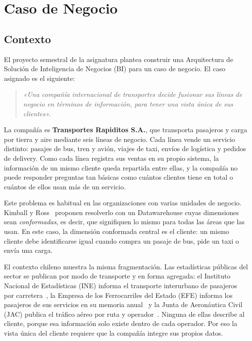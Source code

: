 \section{Caso de Negocio}
\label{sec:caso}

\subsection{Contexto}

El proyecto semestral de la asignatura plantea construir una Arquitectura de
Solución de Inteligencia de Negocios (BI) para un caso de negocio. El caso
asignado es el siguiente:

\begin{quote}
  \itshape
  «Una compañía internacional de transportes decide fusionar sus líneas de
  negocio en términos de información, para tener una vista única de sus
  clientes».
\end{quote}

La compañía es \textbf{Transportes Rapiditos S.A.}, que transporta pasajeros y
carga por tierra y aire mediante seis líneas de negocio. Cada línea vende un
servicio distinto: pasajes de bus, tren y avión, viajes de taxi, envíos de
logística y pedidos de delivery. Como cada línea registra sus ventas en su
propio sistema, la información de un mismo cliente queda repartida entre ellas,
y la compañía no puede responder preguntas tan básicas como cuántos clientes
tiene en total o cuántos de ellos usan más de un servicio.

Este problema es habitual en las organizaciones con varias unidades de negocio.
Kimball y Ross~\cite{kimball2013} proponen resolverlo con un Datawarehouse cuyas
dimensiones sean \emph{conformadas}, es decir, que signifiquen lo mismo para
todas las áreas que las usan. En este caso, la dimensión conformada central es
el cliente: un mismo cliente debe identificarse igual cuando compra un pasaje de
bus, pide un taxi o envía una carga.

El contexto chileno muestra la misma fragmentación. Las estadísticas públicas
del sector se publican por modo de transporte y en forma agregada: el Instituto
Nacional de Estadísticas (INE) informa el transporte interurbano de pasajeros
por carretera~\cite{ine_etranp}, la Empresa de los Ferrocarriles del Estado
(EFE) informa los pasajeros de sus servicios en su memoria
anual~\cite{efe_memoria} y la Junta de Aeronáutica Civil (JAC) publica el
tráfico aéreo por ruta y operador~\cite{jac}. Ninguna de ellas describe al
cliente, porque esa información solo existe dentro de cada operador. Por eso la
vista única del cliente requiere que la compañía integre sus propios datos.

